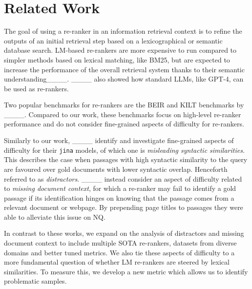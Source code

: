 \section{Related Work}
The goal of using a re-ranker in an information retrieval context is to refine the outputs of an initial retrieval step based on a lexicographical or semantic database search. LM-based re-rankers are more expensive to run compared to simpler methods based on lexical matching, like BM25, but are expected to increase the performance of the overall retrieval system thanks to their semantic understanding____. 
____ also showed how standard LLMs, like GPT-4, can be used as re-rankers.

Two popular benchmarks for re-rankers are the BEIR and KILT benchmarks by ____. 
Compared to our work, these benchmarks focus on high-level re-ranker performance and do not consider fine-grained aspects of difficulty for re-rankers. 

Similarly to our work, ____ identify and investigate fine-grained aspects of difficulty for their \texttt{jina} models, of which one is \emph{misleading syntactic similarities}. This describes the case when passages with high syntactic similarity to the query are favoured over gold documents with lower syntactic overlap. Henceforth referred to as \emph{distractors}. 
____ instead consider an aspect of difficulty related to \emph{missing document context}, for which a re-ranker may fail to identify a gold passage if its identification hinges on knowing that the passage comes from a relevant document or webpage. By prepending page titles to passages they were able to alleviate this issue on NQ. 

In contrast to these works, we expand on the analysis of distractors and missing document context to include multiple SOTA re-rankers, datasets from diverse domains and better tuned metrics. We also tie these aspects of difficulty to a more fundamental question of whether LM re-rankers are steered by lexical similarities. To measure this, we develop a new metric which allows us to identify problematic samples.